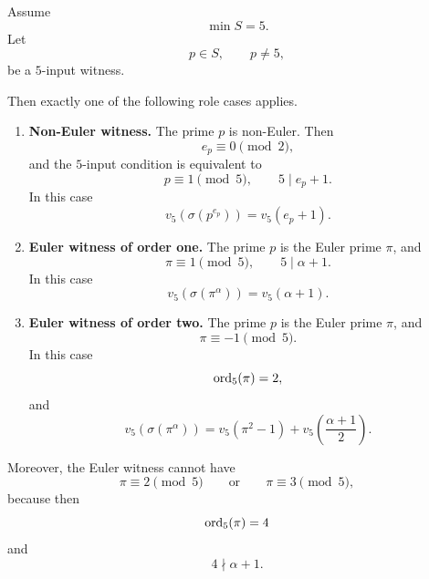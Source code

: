 \begin{lemma}
\label{lem:q5-first-input-classification}
Assume
\[
  \min S=5.
\]
Let
\[
  p\in S,\qquad p\ne5,
\]
be a $5$-input witness.

Then exactly one of the following role cases applies.

\begin{enumerate}[label=(\roman*),leftmargin=2.2em]

\item \textbf{Non-Euler witness.}
      The prime $p$ is non-Euler.  Then
      \[
        e_p\equiv0\pmod2,
      \]
      and the $5$-input condition is equivalent to
      \[
        p\equiv1\pmod5,
        \qquad
        5\mid e_p+1.
      \]
      In this case
      \[
        v_5(\sigma(p^{e_p}))=v_5(e_p+1).
      \]

\item \textbf{Euler witness of order one.}
      The prime $p$ is the Euler prime $\pi$, and
      \[
        \pi\equiv1\pmod5,
        \qquad
        5\mid \alpha+1.
      \]
      In this case
      \[
        v_5(\sigma(\pi^\alpha))=v_5(\alpha+1).
      \]

\item \textbf{Euler witness of order two.}
      The prime $p$ is the Euler prime $\pi$, and
      \[
        \pi\equiv-1\pmod5.
      \]
      In this case
      \[
        \operatorname{ord}_5(\pi)=2,
      \]
      and
      \[
        v_5(\sigma(\pi^\alpha))
        =
        v_5(\pi^2-1)
        +
        v_5\!\left(\frac{\alpha+1}{2}\right).
      \]
\end{enumerate}

Moreover, the Euler witness cannot have
\[
  \pi\equiv2\pmod5
  \qquad\text{or}\qquad
  \pi\equiv3\pmod5,
\]
because then
\[
  \operatorname{ord}_5(\pi)=4
\]
and
\[
  4\nmid \alpha+1.
\]
\end{lemma}

